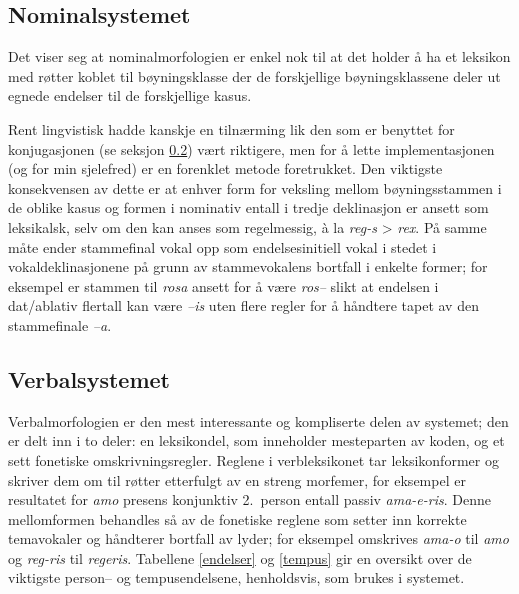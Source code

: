\documentclass{article}
\begin{document}
\subsection{Nominalsystemet}
Det viser seg at nominalmorfologien er enkel nok til at det holder \aa{} ha et
leksikon med r\o{}tter koblet til b\o{}yningsklasse der de forskjellige
b\o{}yningsklassene deler ut egnede endelser til de forskjellige kasus.

Rent lingvistisk hadde kanskje en tiln\ae{}rming lik den som er benyttet for
konjugasjonen (se seksjon \ref{conjugation}) v\ae{}rt riktigere, men for \aa{}
lette implementasjonen (og for min sjelefred) er en forenklet metode
foretrukket. Den viktigste konsekvensen av dette er at enhver form for
veksling mellom b\o{}yningsstammen i de oblike kasus og formen i nominativ
entall i tredje deklinasjon er ansett som leksikalsk, selv om den kan anses
som regelmessig, \`a la \emph{reg-s} > \emph{rex}. P\aa{} samme m\aa{}te ender
stammefinal vokal opp som endelsesinitiell vokal i stedet i
vokaldeklinasjonene p\aa{} grunn av stammevokalens bortfall i enkelte former;
for eksempel er stammen til \emph{rosa} ansett for \aa{} v\ae{}re \emph{ros--}
slikt at endelsen i dat/ablativ flertall kan v\ae{}re \emph{--is} uten flere
regler for \aa{} h\aa{}ndtere tapet av den stammefinale \emph{--a}.

\subsection{Verbalsystemet}
\label{conjugation}
Verbalmorfologien er den mest interessante og kompliserte delen av systemet;
den er delt inn i to deler: en leksikondel, som inneholder mesteparten av
koden, og et sett fonetiske omskrivningsregler. Reglene i verbleksikonet tar
leksikonformer og skriver dem om til r\o{}tter etterfulgt av en streng
morfemer, for eksempel er resultatet for \emph{amo} presens konjunktiv
2.~person entall passiv \emph{ama-e-ris}. Denne mellomformen behandles s\aa{}
av de fonetiske reglene som setter inn korrekte temavokaler og h\aa{}ndterer
bortfall av lyder; for eksempel omskrives \emph{ama-o} til \emph{amo} og
\emph{reg-ris} til \emph{regeris}. Tabellene \ref{endelser} og \ref{tempus}
gir en oversikt over de viktigste person-- og tempusendelsene, henholdsvis,
som brukes i systemet.
\end{document}
